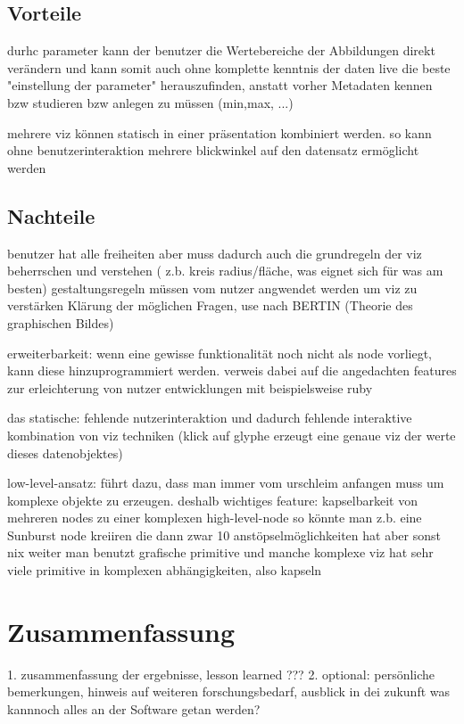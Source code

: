 \documentclass[a4paper, 12pt, DIVcalc, onepage, pdftex, headsepline, footsepline]{scrreprt}
\begin{document}
\section{Vorteile}
\label{sec:Vorteile}
durhc parameter kann der benutzer die Wertebereiche der Abbildungen direkt verändern
und kann somit auch ohne komplette kenntnis der daten live die beste "einstellung
der parameter" herauszufinden, anstatt vorher Metadaten kennen bzw studieren bzw anlegen zu müssen (min,max, ...)

mehrere viz können statisch in einer präsentation kombiniert werden. so kann ohne
benutzerinteraktion mehrere blickwinkel auf den datensatz ermöglicht werden

\section{Nachteile}
\label{sec:Nachteile}
benutzer hat alle freiheiten aber muss dadurch auch die grundregeln der viz beherrschen
und verstehen ( z.b. kreis radius/fläche, was eignet sich für was am besten)
gestaltungsregeln müssen vom nutzer angwendet werden um viz zu verstärken
Klärung der möglichen Fragen, use nach BERTIN (Theorie des graphischen Bildes)

erweiterbarkeit:
wenn eine gewisse funktionalität noch nicht als node vorliegt, kann diese hinzuprogrammiert
werden. verweis dabei auf die angedachten features zur erleichterung von nutzer entwicklungen
mit beispielsweise ruby

das statische:
fehlende nutzerinteraktion und dadurch fehlende interaktive kombination von viz techniken
(klick auf glyphe erzeugt eine genaue viz der werte dieses datenobjektes)

low-level-ansatz:
führt dazu, dass man immer vom urschleim anfangen muss um komplexe objekte zu erzeugen.
deshalb wichtiges feature: kapselbarkeit von mehreren nodes zu einer komplexen high-level-node
so könnte man z.b. eine Sunburst node kreiiren die dann zwar 10 anstöpselmöglichkeiten hat aber sonst nix weiter
man benutzt grafische primitive und manche komplexe viz hat sehr viele primitive in komplexen abhängigkeiten, also kapseln

\chapter{Zusammenfassung}
\label{cha:Zusammenfassung}
1. zusammenfassung der ergebnisse, lesson learned
???
2. optional: persönliche bemerkungen, hinweis auf weiteren forschungsbedarf, ausblick in dei zukunft
was kannnoch alles an der Software getan werden?
\end{document}
